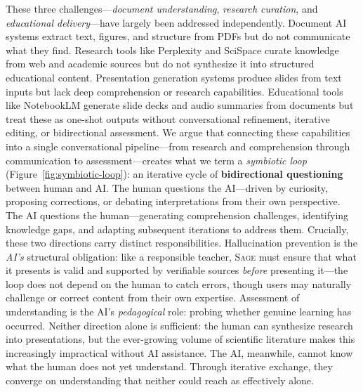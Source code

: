 \documentclass[11pt,a4paper]{article}
\newcommand{\sage}{\textsc{Sage}\xspace}
\begin{document}
These three challenges---\emph{document understanding}, \emph{research curation}, and \emph{educational delivery}---have largely been addressed independently.
Document AI systems extract text, figures, and structure from PDFs but do not communicate what they find.
Research tools like Perplexity and SciSpace curate knowledge from web and academic sources but do not synthesize it into structured educational content.
Presentation generation systems produce slides from text inputs but lack deep comprehension or research capabilities.
Educational tools like NotebookLM generate slide decks and audio summaries from documents but treat these as one-shot outputs without conversational refinement, iterative editing, or bidirectional assessment.
We argue that connecting these capabilities into a single conversational pipeline---from research and comprehension through communication to assessment---creates what we term a \emph{symbiotic loop} (Figure~\ref{fig:symbiotic-loop}): an iterative cycle of \textbf{bidirectional questioning} between human and AI.
The human questions the AI---driven by curiosity, proposing corrections, or debating interpretations from their own perspective.
The AI questions the human---generating comprehension challenges, identifying knowledge gaps, and adapting subsequent iterations to address them.
Crucially, these two directions carry distinct responsibilities.
Hallucination prevention is the \emph{AI's} structural obligation: like a responsible teacher, \sage must ensure that what it presents is valid and supported by verifiable sources \emph{before} presenting it---the loop does not depend on the human to catch errors, though users may naturally challenge or correct content from their own expertise.
Assessment of understanding is the AI's \emph{pedagogical} role: probing whether genuine learning has occurred.
Neither direction alone is sufficient: the human can synthesize research into presentations, but the ever-growing volume of scientific literature makes this increasingly impractical without AI assistance.
The AI, meanwhile, cannot know what the human does not yet understand.
Through iterative exchange, they converge on understanding that neither could reach as effectively alone.
\end{document}
